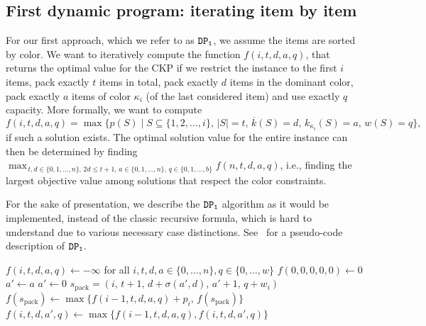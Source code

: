 \documentclass[preprint,11pt]{elsarticle}
\newcommand{\profit}{p}
\newcommand{\weight}{w}
\newcommand{\capacity}{b}
\newcommand{\firstDP}{{\tt DP_1}}
\theoremstyle{definition}
\begin{document}
\subsection{First dynamic program: iterating item by item}
\label{sec:firstDP}
For our first approach, which we refer to as $\firstDP$, we assume the items are sorted by color.
We want to iteratively compute the function $f(i,t,d,a,q)$, that returns the optimal value for the CKP if we restrict the instance to the first $i$ items, pack exactly $t$ items in total, pack exactly $d$ items in the dominant color, pack exactly $a$ items of color $\kappa_i$ (of the last considered item) and use exactly $q$ capacity. 
More formally, we want to compute
\begin{equation}
    f(i,t,d,a,q) = \max\bigg\{\profit(S) \mid S \subseteq \{1,2,\dots, i\}, \, |S| = t, \, \overline{k}(S) = d, \, k_{\kappa_i}(S) = a, \, \weight(S) = q\bigg\}, \label{dp1:goal}
\end{equation}
if such a solution exists.
The optimal solution value for the entire instance can then be determined by finding \(\max_{\, t,d \in \{0,1,\dots,n\}, \, 2  d \leq t + 1, \, a \in \{0,1,\dots,n\}, \, q \in \{0,1, \dots, \capacity \}} f(n,t,d,a,q) \), i.e., finding the largest objective value among solutions that respect the color constraints.

For the sake of presentation, we describe the $\firstDP$ algorithm as it would be implemented, instead of the classic recursive formula, which is hard to understand due to various necessary case distinctions. 
See~ for a pseudo-code description of $\firstDP$.
\begin{algorithm}
    \caption{$\firstDP$ algorithm for the CKP }
    \label{firstdp}
    \begin{algorithmic}[1]
        \Function{$\firstDP$}{$m, n, \boldsymbol \kappa, \boldsymbol\profit, \boldsymbol\weight, \capacity$}
        \State $f(i,t,d,a,q) \gets -\infty$ for all $i,t,d,a \in \{0,\dots,n\}, q \in \{0,\dots,\weight\}$ 
        \State $f(0,0,0,0,0)  \gets 0 $ 
         \label{dp1:extendablestates}
         
            \State $a' \gets a$ 
        \Else {}
            \State $a' \gets 0$ \label{dp1:colorswitch}
        \EndIf
        \State $s_\mathrm{pack} = (i, \, t+1, \, d+\sigma(a',d), \, a' + 1, \, q + \weight_i)$
        \State $f(s_\mathrm{pack}) \gets \max\{f(i-1,t,d,a,q) + \profit_i, \, f(s_\mathrm{pack})\}$ \label{dp1:packitem}
        \State $f(i,t,d,a',q) \gets \max \{f(i-1,t,d,a,q), f(i,t,d,a',q)\} $ \label{dp1:dontpackitem}
        \EndFor
        \EndFor
        \EndFunction
    \end{algorithmic}
\end{algorithm}
\end{document}

